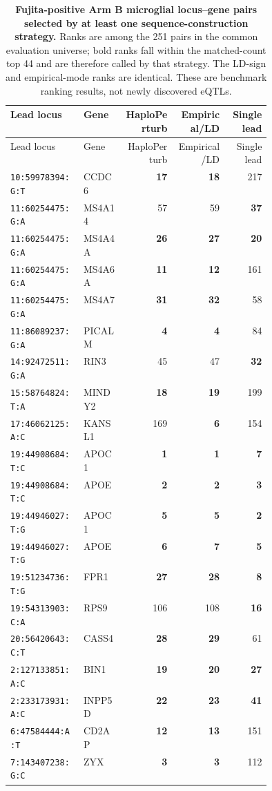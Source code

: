 \begin{longtable}{p{0.28\linewidth}p{0.16\linewidth}rrr}
\caption{\textbf{Fujita-positive Arm B microglial locus--gene pairs selected by at least one sequence-construction strategy.} Ranks are among the 251 pairs in the common evaluation universe; bold ranks fall within the matched-count top 44 and are therefore called by that strategy. The LD-sign and empirical-mode ranks are identical. These are benchmark ranking results, not newly discovered eQTLs.}\label{tab:supp-public-baseline-genes}\\
\toprule
Lead locus & Gene & HaploPerturb & Empirical/LD & Single lead \\
\midrule
\endfirsthead
\toprule
Lead locus & Gene & HaploPerturb & Empirical/LD & Single lead \\
\midrule
\endhead
\texttt{10:59978394:G:T} & CCDC6 & \textbf{17} & \textbf{18} & 217 \\
\texttt{11:60254475:G:A} & MS4A14 & 57 & 59 & \textbf{37} \\
\texttt{11:60254475:G:A} & MS4A4A & \textbf{26} & \textbf{27} & \textbf{20} \\
\texttt{11:60254475:G:A} & MS4A6A & \textbf{11} & \textbf{12} & 161 \\
\texttt{11:60254475:G:A} & MS4A7 & \textbf{31} & \textbf{32} & 58 \\
\texttt{11:86089237:G:A} & PICALM & \textbf{4} & \textbf{4} & 84 \\
\texttt{14:92472511:G:A} & RIN3 & 45 & 47 & \textbf{32} \\
\texttt{15:58764824:T:A} & MINDY2 & \textbf{18} & \textbf{19} & 199 \\
\texttt{17:46062125:A:C} & KANSL1 & 169 & \textbf{6} & 154 \\
\texttt{19:44908684:T:C} & APOC1 & \textbf{1} & \textbf{1} & \textbf{7} \\
\texttt{19:44908684:T:C} & APOE & \textbf{2} & \textbf{2} & \textbf{3} \\
\texttt{19:44946027:T:G} & APOC1 & \textbf{5} & \textbf{5} & \textbf{2} \\
\texttt{19:44946027:T:G} & APOE & \textbf{6} & \textbf{7} & \textbf{5} \\
\texttt{19:51234736:T:G} & FPR1 & \textbf{27} & \textbf{28} & \textbf{8} \\
\texttt{19:54313903:C:A} & RPS9 & 106 & 108 & \textbf{16} \\
\texttt{20:56420643:C:T} & CASS4 & \textbf{28} & \textbf{29} & 61 \\
\texttt{2:127133851:A:C} & BIN1 & \textbf{19} & \textbf{20} & \textbf{27} \\
\texttt{2:233173931:A:C} & INPP5D & \textbf{22} & \textbf{23} & \textbf{41} \\
\texttt{6:47584444:A:T} & CD2AP & \textbf{12} & \textbf{13} & 151 \\
\texttt{7:143407238:G:C} & ZYX & \textbf{3} & \textbf{3} & 112 \\
\bottomrule
\end{longtable}
